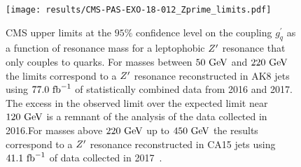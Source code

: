 \begin{figure}[htbp]
 \centering
 \texttt{[image: results/CMS-PAS-EXO-18-012\_Zprime\_limits.pdf]}
 \caption[CMS upper limits at $95\%$ CL on the coupling $g_{q}^{\prime}$ as a function of resonance mass for a leptophobic $\Zprime$ resonance that only couples to quarks using $77.0~\ifb$.]{%
  CMS upper limits at the $95\%$ confidence level on the coupling $g_{q}^{\prime}$ as a function of resonance mass for a leptophobic $\Zprime$ resonance that only couples to quarks.
  For masses between $50~\mathrm{GeV}$ and $220~\mathrm{GeV}$ the limits correspond to a $\Zprime$ resonance reconstructed in AK8 jets using $77.0~\ifb$ of statistically combined data from 2016 and 2017.
  The excess in the observed limit over the expected limit near $120~\mathrm{GeV}$ is a remnant of the analysis of the data collected in 2016.For masses above $220~\mathrm{GeV}$ up to $450~\mathrm{GeV}$ the results correspond to a $\Zprime$ resonance reconstructed in CA15 jets using $41.1~\mathrm{fb}^{-1}$ of data collected in 2017~\cite{CMS:2019hlx}.
 }
 \label{fig:CMS-PAS-EXO-18-012_Zprime_limits}
\end{figure}
